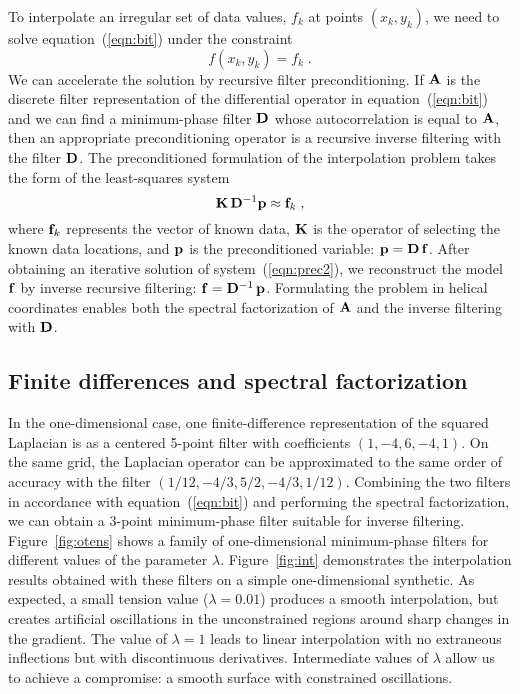 To interpolate an irregular set of data values, $f_k$ at points
$(x_k,y_k)$, we need to solve equation~(\ref{eqn:bit}) under the
constraint
\begin{equation}
  \label{fk}
  f(x_k,y_k) = f_k\;.
\end{equation}
We can accelerate the solution by recursive filter preconditioning. If
$\bold{A}$ is the discrete filter representation of the differential
operator in equation~(\ref{eqn:bit}) and we can find a minimum-phase
filter $\bold{D}$ whose autocorrelation is equal to $\bold{A}$, then
an appropriate preconditioning operator is a recursive inverse
filtering with the filter $\bold{D}$. The preconditioned formulation
of the interpolation problem takes the form of the least-squares system 
\cite{iee}
\begin{equation}
\bold{K}\, \bold{D}^{-1} \bold{p} \approx  \bold{f}_k\;,
\label{eqn:prec2}
\end{equation}
where $\bold{f}_k$ represents the vector of known data, $\bold{K}$ is
the operator of selecting the known data locations, and $\bold{p}$ is
the preconditioned variable: $\bold{p} = \bold{D\, f}$. After
obtaining an iterative solution of system~(\ref{eqn:prec2}), we
reconstruct the model $\bold{f}$ by inverse recursive filtering:
$\bold{f} = \bold{D}^{-1}\,\bold{p}$. Formulating the problem in
helical coordinates \cite{helix0,helix} enables both the spectral
factorization of $\bold{A}$ and the inverse filtering with $\bold{D}$.

\subsection{Finite differences and spectral factorization}


In the one-dimensional case, one finite-difference representation of
the squared Laplacian is as a centered 5-point filter with
coefficients $(1,-4,6,-4,1)$. On the same grid, the Laplacian operator
can be approximated to the same order of accuracy with the filter
$(1/12,-4/3,5/2,-4/3,1/12)$.  Combining the two filters in accordance
with equation~(\ref{eqn:bit}) and performing the spectral
factorization, we can obtain a 3-point minimum-phase filter suitable
for inverse filtering.  Figure~\ref{fig:otens} shows a family of
one-dimensional minimum-phase filters for different values of the
parameter $\lambda$.  Figure~\ref{fig:int} demonstrates the
interpolation results obtained with these filters on a simple
one-dimensional synthetic. As expected, a small tension value
($\lambda=0.01$) produces a smooth interpolation, but creates
artificial oscillations in the unconstrained regions around sharp
changes in the gradient. The value of $\lambda=1$ leads to linear
interpolation with no extraneous inflections but with discontinuous
derivatives. Intermediate values of $\lambda$ allow us to achieve a
compromise: a smooth surface with constrained oscillations.

